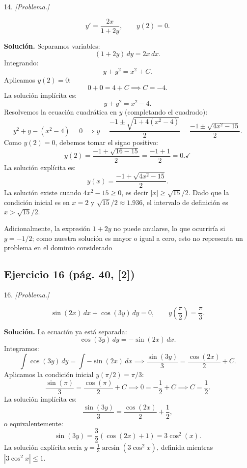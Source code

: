 \begin{enunciado}{14.}
    \textit{[Problema.]}
\end{enunciado}

\begin{respuesta}
\[
  y' = \frac{2x}{1+2y}, \qquad y(2) = 0.
\]

\textbf{Soluci\'on.} Separamos variables:
\[
  (1+2y)\,dy = 2x\,dx.
\]
Integrando:
\[
  y + y^2 = x^2 + C.
\]
Aplicamos $y(2) = 0$:
\[
  0 + 0 = 4 + C \implies C = -4.
\]
La soluci\'on impl\'icita es:
\[
  y + y^2 = x^2 - 4.
\]
Resolvemos la ecuaci\'on cuadr\'atica en $y$ (completando el cuadrado):
\[
  y^2 + y - (x^2-4) = 0
  \implies
  y = \frac{-1 \pm \sqrt{1 + 4(x^2-4)}}{2} = \frac{-1 \pm \sqrt{4x^2-15}}{2}.
\]
Como $y(2) = 0$, debemos tomar el signo positivo:
\[
  y(2) = \frac{-1 + \sqrt{16-15}}{2} = \frac{-1+1}{2} = 0. \checkmark
\]
La soluci\'on expl\'icita es:
\[
  \boxed{y(x) = \frac{-1 + \sqrt{4x^2 - 15}}{2}.}
\]
La soluci\'on existe cuando $4x^2 - 15 \geq 0$, es decir $|x| \geq \sqrt{15}/2$.
Dado que la condici\'on inicial es en $x=2$ y $\sqrt{15}/2 \approx 1.936$,
el intervalo de definici\'on es $x > \sqrt{15}/2$.

Adicionalmente, la expresi\'on $1+2y$ no puede anularse, lo que ocurrir\'ia si
$y = -1/2$; como nuestra soluci\'on es mayor o igual a cero, esto no representa
un problema en el dominio considerado
    \vspace{7cm}
\end{respuesta}

\subsection*{Ejercicio 16 \quad\normalfont\small(pág. 40, [2])}

\begin{enunciado}{16.}
    \textit{[Problema.]}
\end{enunciado}

\begin{respuesta}
\[
  \sin(2x)\,dx + \cos(3y)\,dy = 0, \qquad y\!\left(\frac{\pi}{2}\right) = \frac{\pi}{3}.
\]

\textbf{Soluci\'on.} La ecuaci\'on ya est\'a separada:
\[
  \cos(3y)\,dy = -\sin(2x)\,dx.
\]
Integramos:
\[
  \int \cos(3y)\,dy = \int -\sin(2x)\,dx
  \implies
  \frac{\sin(3y)}{3} = \frac{\cos(2x)}{2} + C.
\]
Aplicamos la condici\'on inicial $y(\pi/2) = \pi/3$:
\[
  \frac{\sin(\pi)}{3} = \frac{\cos(\pi)}{2} + C
  \implies
  0 = -\frac{1}{2} + C
  \implies C = \frac{1}{2}.
\]
La soluci\'on impl\'icita es:
\[
  \frac{\sin(3y)}{3} = \frac{\cos(2x)}{2} + \frac{1}{2},
\]
o equivalentemente:
\[
  \boxed{\sin(3y) = \frac{3}{2}\left(\cos(2x) + 1\right) = 3\cos^2(x).}
\]
La soluci\'on expl\'icita ser\'ia $y = \tfrac{1}{3}\arcsin\!\left(3\cos^2 x\right)$,
definida mientras $|3\cos^2 x| \leq 1$.
    \vspace{7cm}
\end{respuesta}

